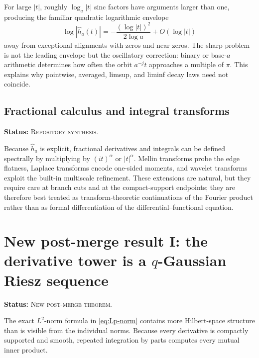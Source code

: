 \documentclass[11pt,oneside]{article}
\theoremstyle{definition}
\theoremstyle{remark}
\newcommand{\RepoStatus}{\textcolor{RepoOlive}{\textsc{Repository synthesis}}}
\newcommand{\DerivedStatus}{\textcolor{DerivedPurple}{\textsc{New post-merge theorem}}}
\newcommand{\status}[1]{\par\smallskip\noindent\textbf{Status:} #1.\par\smallskip}
\begin{document}
For large \(|t|\), roughly \(\log_a|t|\) sinc factors have arguments larger than one, producing the familiar quadratic logarithmic envelope
\begin{equation}
  \log|\widehat h_a(t)|
  =-\frac{(\log|t|)^2}{2\log a}+O(\log|t|)
  \label{eq:rough-fourier-envelope}
\end{equation}
away from exceptional alignments with zeros and near-zeros.  The sharp problem is not the leading envelope but the oscillatory correction: binary or base-\(a\) arithmetic determines how often the orbit \(a^{-j}t\) approaches a multiple of \(\pi\).  This explains why pointwise, averaged, limsup, and liminf decay laws need not coincide.

\subsection{Fractional calculus and integral transforms}
\status{\RepoStatus}

Because \(\widehat h_a\) is explicit, fractional derivatives and integrals can be defined spectrally by multiplying by \((it)^\alpha\) or \(|t|^\alpha\).  Mellin transforms probe the edge flatness, Laplace transforms encode one-sided moments, and wavelet transforms exploit the built-in multiscale refinement.  These extensions are natural, but they require care at branch cuts and at the compact-support endpoints; they are therefore best treated as transform-theoretic continuations of the Fourier product rather than as formal differentiation of the differential--functional equation.


\section{New post-merge result I: the derivative tower is a \texorpdfstring{\(q\)}{q}-Gaussian Riesz sequence}
\label{sec:q-gaussian-derivatives}
\status{\DerivedStatus}

The exact \(L^2\)-norm formula in \eqref{eq:Lp-norm} contains more Hilbert-space structure than
is visible from the individual norms.  Because every derivative is compactly supported and
smooth, repeated integration by parts computes every mutual inner product.
\end{document}
